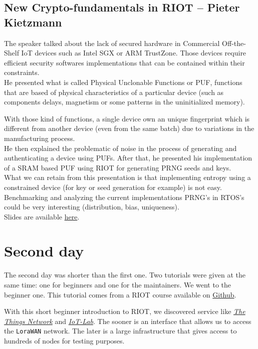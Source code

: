 \documentclass[journal, a4paper]{../IEEEtran}
\begin{document}
\subsection{New Crypto-fundamentals in RIOT -- Pieter Kietzmann}

The speaker talked about the lack of secured hardware in Commercial Off-the-Shelf IoT devices such as Intel SGX or ARM TrustZone.
Those devices require efficient security softwares implementations that can be contained within their constraints.\\

He presented what is called Physical Unclonable Functions or PUF, 
    functions that are based of physical characteristics of a particular device (such as components delays, magnetism or some patterns in the uninitialized memory).

With those kind of functions, a single device own an unique fingerprint which is different from another device (even from the same batch) due to variations in the manufacturing process. \\

He then explained the problematic of noise in the process of generating and authenticating a device using PUFs.
After that, he presented his implementation of a SRAM based PUF using RIOT for generating PRNG seeds and keys. \\

What we can retain from this presentation is that implementing entropy using a constrained device (for key or seed generation for example) is not easy. \\
Benchmarking and analyzing the current implementations PRNG's in RTOS's could be very interesting (distribution, bias, uniqueness). \\

Slides are available \href{http://summit.riot-os.org/2018/wp-content/uploads/sites/10/2018/09/3_2-Peter-Kietzmann-Crypto-Fundamentals.pdf}{here}.

\section{Second day}
The second day was shorter than the first one.
Two tutorials were given at the same time: one for beginners and one for the maintainers.
We went to the beginner one.
This tutorial comes from a RIOT course available on \href{https://github.com/aabadie/riot-course}{Github}.

With this short beginner introduction to RIOT, we discovered service like \textit{\href{https://www.thethingsnetwork.org/}{The Things Network}} and \textit{\href{https://www.iot-lab.info/}{IoT-Lab}}. 
The sooner is an interface that allows us to access the \texttt{LoraWAN} network. 
The later is a large infrastructure that gives access to hundreds of nodes for testing purposes.
\end{document}
